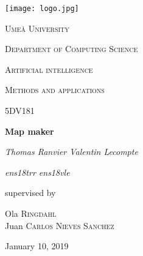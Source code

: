 \begin{titlepage}
    \centering
    \texttt{[image: logo.jpg]} \par\vspace{1cm}
    {\scshape\LARGE Umeå University \par}
    {\scshape\Large Department of Computing Science\par}
    \vspace{1cm}
    {\scshape\Large Artificial intelligence\par}
    {\scshape\Large Methods and applications\par}
    \vspace{0.5cm}
    {\scshape\large 5DV181\par}
    \vspace{1.5cm}
    {\huge\bfseries Map maker\par}
    \vspace{2cm}
    {\Large\itshape Thomas Ranvier \hspace{1.5cm} Valentin Lecompte \par}
    {\Large\itshape ens18trr \hspace{3.5cm} ens18vle\par}
    \vfill 
    {\large supervised by\par}
    Ola \textsc{Ringdahl}
    \\
    Juan \textsc{Carlos Nieves Sanchez}
    \vfill 
    {\large January 10, 2019\par}
\end{titlepage}
